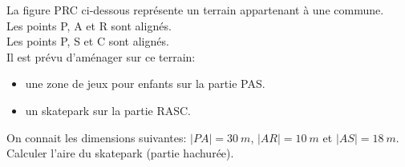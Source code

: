 %
%
    La figure PRC ci-dessous représente un terrain appartenant à une commune.\\
    Les points P, A et R sont alignés.\\
    Les points P, S et C sont alignés.\\
    Il est prévu d'aménager sur ce terrain:
    \begin{itemize}
        \item une zone de jeux pour enfants sur la partie PAS.
        \item un skatepark sur la partie RASC.
    \end{itemize}
    On connait les dimensions suivantes: $|PA|=\SI{30}{m}$, $|AR|=\SI{10}{m}$ et $|AS|=\SI{18}{m}$.\\
    Calculer l'aire du skatepark (partie hachurée).\\
    \begin{center}
        
    \end{center}
